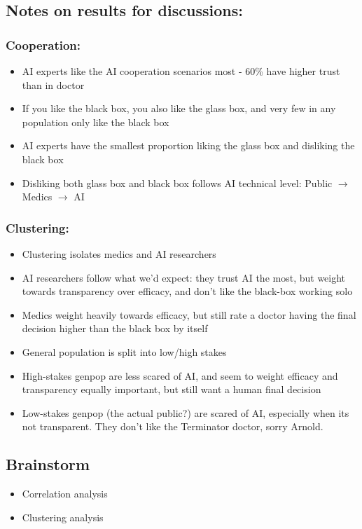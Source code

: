 \documentclass[manuscript,screen,review]{acmart}
\begin{document}
\subsection{Notes on results for discussions:}

\subsubsection{Cooperation:}
\begin{itemize}
    \item AI experts like the AI cooperation scenarios most - 60\% have higher trust than in doctor
    \item If you like the black box, you also like the glass box, and very few in any population only like the black box
    \item AI experts have the smallest proportion liking the glass box and disliking the black box
    \item Disliking both glass box and black box follows AI technical level: Public $\rightarrow$ Medics $\rightarrow$ AI
\end{itemize}

\subsubsection{Clustering:}
\begin{itemize}
    \item Clustering isolates medics and AI researchers
    \item AI researchers follow what we'd expect: they trust AI the most, but weight towards transparency over efficacy, and don't like the black-box working solo
    \item Medics weight heavily towards efficacy, but still rate a doctor having the final decision higher than the black box by itself
    \item General population is split into low/high stakes
    \item High-stakes genpop are less scared of AI, and seem to weight efficacy and transparency equally important, but still want a human final decision
    \item Low-stakes genpop (the actual public?) are scared of AI, especially when its not transparent. They don't like the Terminator doctor, sorry Arnold.
\end{itemize}






\subsection{Brainstorm}
\begin{itemize}
    \item Correlation analysis
    \item Clustering analysis
\end{itemize}
\end{document}

